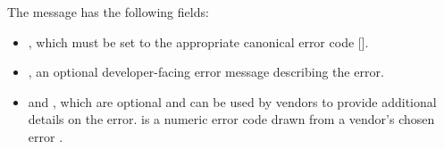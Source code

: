\documentclass[11pt]{article}
\begin{document}
{%
The  message has the following fields:%

\begin{itemize}[noitemsep,topsep=\mdcompacttopsep]%

\item{}, which must be set to the appropriate canonical error code
[].%

\item{}, an optional developer-facing error message describing the error.%

\item{} and , which are optional and can be used by vendors to provide
additional details on the error.  is a numeric error code drawn from a
vendor's chosen error .%


\end{itemize}}
\end{document}
